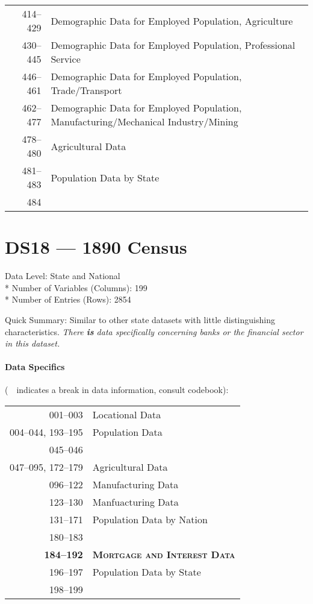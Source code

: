 ﻿\documentclass[12pt]{report}
\begin{document}
	\newpage
	\begin{tabular}{r|l}
		414--429 & Demographic Data for Employed Population, Agriculture\\
		430--445 & Demographic Data for Employed Population, Professional Service\\
		446--461 & Demographic Data for Employed Population, Trade/Transport\\
		462--477 & \parbox[t]{10cm}{Demographic Data for Employed Population,\\ Manufacturing/Mechanical Industry/Mining}\\
		478--480 & Agricultural Data\\
		481--483 & Population Data by State\\
		484 & \guillemotleft~\guillemotright
	\end{tabular}
	\newpage

\section{DS18 --- 1890 Census}
	Data Level: State and National\\*
	Number of Variables (Columns): 199\\*
	Number of Entries (Rows): 2854
	\vspace{1.5em}
	
	\noindent Quick Summary: Similar to other state datasets with little distinguishing characteristics. \textit{There \emph{\textbf{is}} data specifically concerning banks or the financial sector in this dataset.}
	
	\paragraph{Data Specifics} (\guillemotleft~\guillemotright~indicates a break in data information, consult codebook):
	\vspace{1em}
	
	\begin{tabular}{r|l}
		001--003 & Locational Data\\
		004--044, 193--195 & Population Data\\
		045--046 & \guillemotleft~\guillemotright\\
		047--095, 172--179 & Agricultural Data\\
		096--122 & Manufacturing Data\\
		123--130 & Manfuacturing Data\\
		131--171 & Population Data by Nation\\
		180--183 & \guillemotleft~\guillemotright\\
		\textbf{184--192} & \textsc{ \textbf{Mortgage and Interest Data} }\\
		196--197 & Population Data by State\\
		198--199 & \guillemotleft~\guillemotright
	\end{tabular}
	\newpage
\end{document}
